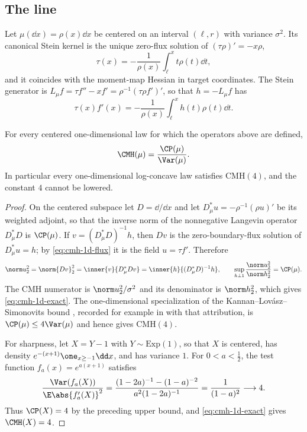 \documentclass[../../main.tex]{subfiles}
\begin{document}
\subsection{The line}
\label{subsec:cmh-1d}

Let $\mu(\dd x)=\rho(x)\dd x$ be centered on an interval $(\ell,r)$ with variance $\sigma^2$.
Its canonical Stein kernel is the unique zero-flux solution of $(\tau\rho)'=-x\rho$,
\begin{equation}
  \tau(x)=-\frac1{\rho(x)}\int_\ell^xt\rho(t)\dd t,
  \label{eq:cmh-1d-stein}
\end{equation}
and it coincides with the moment-map Hessian in target coordinates. The Stein generator is
$L_\mu f=\tau f''-xf'=\rho^{-1}(\tau\rho f')'$, so that $h=-L_\mu f$ has
\begin{equation}
  \tau(x)f'(x)=-\frac1{\rho(x)}\int_\ell^xh(t)\rho(t)\dd t.
  \label{eq:cmh-1d-flux}
\end{equation}

\begin{theorem}
\label{thm:cmh-1d}
For every centered one-dimensional law for which the operators above are defined,
\begin{equation}
  \CMH(\mu)=\frac{\CP(\mu)}{\Var(\mu)}.
  \label{eq:cmh-1d-exact}
\end{equation}
In particular every one-dimensional log-concave law satisfies $\mathrm{CMH}(4)$, and the
constant $4$ cannot be lowered.
\end{theorem}

\begin{proof}
On the centered subspace let $D=\dd/\dd x$ and let $D_\mu^*u=-\rho^{-1}(\rho u)'$ be its
weighted adjoint, so that the inverse norm of the nonnegative Langevin operator $D_\mu^*D$ is
$\CP(\mu)$. If $v=(D_\mu^*D)^{-1}h$, then $Dv$ is the zero-boundary-flux solution of
$D_\mu^*u=h$; by \eqref{eq:cmh-1d-flux} it is the field $u=\tau f'$. Therefore
\[
  \norm u_2^2=\norm{Dv}_2^2
  =\inner{v}{D_\mu^*Dv}
  =\inner{h}{(D_\mu^*D)^{-1}h},
  \qquad
  \sup_{h\perp1}\frac{\norm u_2^2}{\norm h_2^2}=\CP(\mu).
\]
The CMH numerator is $\norm u_2^2/\sigma^2$ and its denominator is $\norm h_2^2$, which gives
\eqref{eq:cmh-1d-exact}. The one-dimensional specialization of the
Kannan--Lov\'asz--Simonovits bound \cite{KannanLovaszSimonovits1995}, recorded for example in
\cite[Eq.~(2.25)]{cattiaux2018poincare} with that attribution, is
$\CP(\mu)\le4\Var(\mu)$ and hence gives $\mathrm{CMH}(4)$.

For sharpness, let $X=Y-1$ with $Y\sim\mathrm{Exp}(1)$, so that $X$ is centered, has density
$e^{-(x+1)}\one_{x\ge-1}\dd x$, and has variance $1$. For $0<a<\tfrac12$, the test function
$f_a(x)=e^{a(x+1)}$ satisfies
\[
  \frac{\Var(f_a(X))}{\E\abs{f_a'(X)}^2}
  =\frac{(1-2a)^{-1}-(1-a)^{-2}}{a^2(1-2a)^{-1}}
  =\frac1{(1-a)^2}\longrightarrow4.
\]
Thus $\CP(X)=4$ by the preceding upper bound, and \eqref{eq:cmh-1d-exact} gives $\CMH(X)=4$.
\end{proof}
\end{document}
